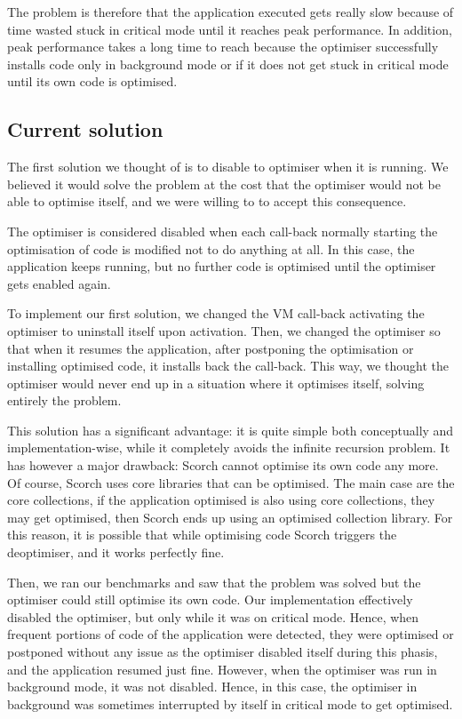 \documentclass[a4paper,12pt,twoside]{../includes/ThesisStyle}
\begin{document}
The problem is therefore that the application executed gets really slow because of time wasted stuck in critical mode until it reaches peak performance. In addition, peak performance takes a long time to reach because the optimiser successfully installs code only in background mode or if it does not get stuck in critical mode until its own code is optimised. 

\subsection{Current solution}

The first solution we thought of is to disable to optimiser when it is running. We believed it would solve the problem at the cost that the optimiser would not be able to optimise itself, and we were willing to to accept this consequence.

The optimiser is considered disabled when each call-back normally starting the optimisation of code is modified not to do anything at all. In this case, the application keeps running, but no further code is optimised until the optimiser gets enabled again.

To implement our first solution, we changed the VM call-back activating the optimiser to uninstall itself upon activation. Then, we changed the optimiser so that when it resumes the application, after postponing the optimisation or installing optimised code, it installs back the call-back. This way, we thought the optimiser would never end up in a situation where it optimises itself, solving entirely the problem.

This solution has a significant advantage: it is quite simple both conceptually and implementation-wise, while it completely avoids the infinite recursion problem. It has however a major drawback: Scorch cannot optimise its own code any more. Of course, Scorch uses core libraries that can be optimised. The main case are the core collections, if the application optimised is also using core collections, they may get optimised, then Scorch ends up using an optimised collection library. For this reason, it is possible that while optimising code Scorch triggers the deoptimiser, and it works perfectly fine.

Then, we ran our benchmarks and saw that the problem was solved but the optimiser could still optimise its own code. Our implementation effectively disabled the optimiser, but only while it was on critical mode. Hence, when frequent portions of code of the application were detected, they were optimised or postponed without any issue as the optimiser disabled itself during this phasis, and the application resumed just fine. However, when the optimiser was run in background mode, it was not disabled. Hence, in this case, the optimiser in background was sometimes interrupted by itself in critical mode to get optimised.
\end{document}
